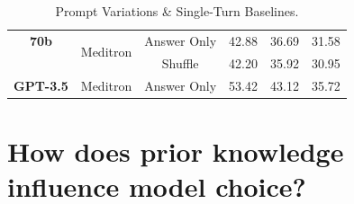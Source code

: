 \begin{table}[ht]
{\begin{tabular}{cccccc}
\textbf{70b} & \multirow{2}{*}{Meditron} & Answer Only & \cellcolor{darkgrhl}42.88 & \cellcolor{greenhl}36.69 & \cellcolor{redhl}31.58 \\
 & & Shuffle & \cellcolor{darkgrhl}42.20 & \cellcolor{greenhl}35.92 & \cellcolor{redhl}30.95 \\ 
 \midrule
\textbf{GPT-3.5} & Meditron & Answer Only & \cellcolor{forestgrhl}53.42 & \cellcolor{darkgrhl}43.12 & \cellcolor{greenhl}35.72 \\ 
\bottomrule
    \end{tabular}}
    \vspace{1mm}
    \caption{Prompt Variations \& Single-Turn Baselines.}\label{tab:preliminary}\vspace{-5mm}
\end{table}




\section{How does prior knowledge influence model choice?}\label{app:generality}



